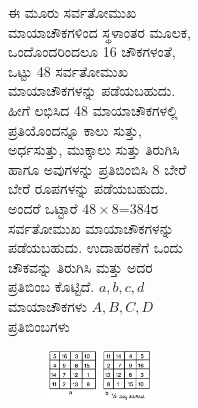 \begin{figure}[H]
\begin{figure}[H]
\begin{figure}[H]
\begin{figure}[H]
ಈ ಮೂರು ಸರ್ವತೋಮುಖ ಮಾಯಾಚೌಕಗಳಿಂದ ಸ್ಥಳಾಂತರ ಮೂಲಕ, ಒಂದೊಂದ\-ರಿಂದಲೂ 16 ಚೌಕಗಳಂತೆ, ಒಟ್ಟು 48 ಸರ್ವತೋಮುಖ ಮಾಯಾಚೌಕಗಳನ್ನು ಪಡೆಯ\-ಬಹುದು. ಹೀಗೆ ಲಭಿಸಿದ 48 ಮಾಯಾಚೌಕಗಳಲ್ಲಿ ಪ್ರತಿಯೊಂದನ್ನೂ ಕಾಲು ಸುತ್ತು, ಅರ್ಧಸುತ್ತು, ಮುಕ್ಕಾಲು ಸುತ್ತು ತಿರುಗಿಸಿ ಹಾಗೂ ಅವುಗಳನ್ನು ಪ್ರತಿಬಿಂಬಿಸಿ 8 ಬೇರೆ ಬೇರೆ ರೂಪಗಳನ್ನು ಪಡೆಯಬಹುದು. ಅಂದರೆ ಒಟ್ಟಾರೆ $48 \times 8$=384ರ ಸರ್ವತೋಮುಖ ಮಾಯಾಚೌಕಗಳನ್ನು ಪಡೆಯಬಹುದು. ಉದಾಹರಣೆಗೆ ಒಂದು ಚೌಕವನ್ನು ತಿರುಗಿಸಿ ಮತ್ತು ಅದರ ಪ್ರತಿಬಿಂಬ ಕೊಟ್ಟಿದೆ. $a, b, c, d$ ಮಾಯಾಚೌಕಗಳು $A, B, C, D$ ಪ್ರತಿಬಿಂಬಗಳು
\begin{figure}[H]
\includegraphics[scale=.8]{src/figures/chap4/fig4.11.jpg}
\end{figure}

\newpage


\end{figure}
\end{figure}
\end{figure}
\end{figure}
